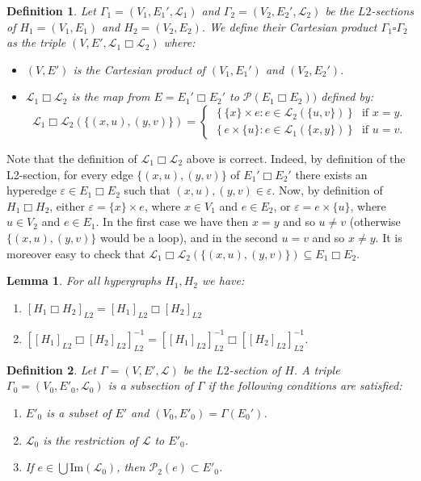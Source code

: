 \documentclass[copyright]{eptcs}
\newtheorem{Def}{Definition}
\newtheorem{Lem}{Lemma}
\newcommand{\mc}[1]{\mathcal{#1}}
\newcommand{\chg}[1]{{#1}}
\begin{document}
\begin{Def}\label{DfProductLabeledGraph} Let $\Gamma_1=(V_1,E_1',\mc L_1)$ and $\Gamma_2= (V_2,E_2',\mc L_2)$ be the $L2$-sections of $H_1= (V_1, E_1)$ and $H_2=(V_2,E_2)$. We define their Cartesian product $\Gamma_1 \square \Gamma_2$ as the triple $(V, E', \mc L_1 \Box \mc L_2)$ where:
\begin{itemize}
 \item $(V,E')$ is the Cartesian product of $(V_1,E_1')$ and $(V_2,E_2')$.
 \item $\mc L_1 \Box \mc L_2$ is the map from $E = E_1' \Box E_2'$ to $\mc P (E_1 \Box E_2))$ defined by:
\[ \mc L_1 \Box \mc L_2 (\{(x,u),(y,v)\})= \left\{ \; \begin{array}{ll} \{\,\{x\} \times e : e \in \mc L_2(\{u,v\}) \, \} & \textrm{if $x = y$.}\\
                                        \{\,e \times \{u\} : e \in \mc L_1(\{x,y\})\,\} & \textrm{if $u = v$.} \end{array} \right. \]
\end{itemize}
\end{Def}

Note that the definition of $\mc L_1 \Box \mc L_2$ above is
correct. Indeed, by definition of the L2-section, for every edge
$\{(x,u),(y,v)\}$ of $E_1' \Box E_2'$ there exists an hyperedge
$\varepsilon \in E_1 \Box E_2$ such that $(x,u),(y,v) \in
\varepsilon$. Now, by definition of $H_1 \Box H_2$, either
$\varepsilon = \{x\} \times e$, where $x \in V_1$ and $e \in E_2$,
or $\varepsilon = e \times \{u\}$, where $u \in V_2$ and $e \in
E_1$. In the first case we have then $x =y$ and so $u\neq v$
(otherwise $\{(x,u),(y,v)\}$ would be a loop), and in the second
$u=v$ and so $x \neq y$. It is moreover easy to check that $\mc
L_1 \Box \mc L_2(\{(x,u),(y,v)\}) \subseteq E_1 \Box E_2$.

\begin{Lem}\label{LemSCommuteWithCartesian} For all hypergraphs $H_1, H_2$ we have:
\begin{enumerate}
\item $[H_1 \Box H_2]_{L2} = [H_1]_{L2} \Box [H_2]_{L2}$\\[2pt]
\item $[[H_1]_{L2} \Box [H_2]_{L2}]_{L2}^{-1} = [[H_1]_{L2}]_{L2}^{-1} \Box [[H_2]_{L2}]^{-1}_{L2}$.
\end{enumerate}
\end{Lem}


\begin{Def}\label{DfSubsection} Let $\Gamma= (V,E',\mc L)$ be the $L2$-section of $H$. A triple $\Gamma_0 = (V_0, E'_0, \mc L_0)$ is a \emph{subsection} of $\Gamma$ if the following conditions are satisfied:
\begin{enumerate}
\item \chg{$E'_0$ is a subset of $E'$ and $(V_0,E'_0) = \Gamma (E_0')$.}
\item $\mc L_0$ is the restriction of $\mc L$ to $E'_0$. \item
\chg{If $e \in \bigcup \textrm{Im}(\mc L_0)$, then $\mc P_2(e) \subset
E'_0$.}
\end{enumerate}
\end{Def}
\end{document}
